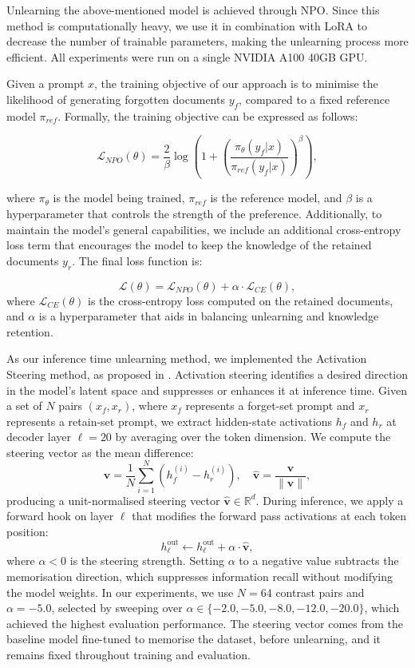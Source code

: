 \documentclass[10pt, a4paper]{article}
\begin{document}
Unlearning the above-mentioned model is achieved through NPO. Since this method is computationally heavy, we use it in combination with LoRA to decrease the number of trainable parameters, making the unlearning process more efficient. All experiments were run on a single NVIDIA A100 40GB GPU.

Given a prompt $x$, the training objective of our approach is to minimise the likelihood of generating forgotten documents $y_f$, compared to a fixed reference model $\pi_{ref}$. Formally, the training objective can be expressed as follows:

\[
\mathcal{L}_{NPO}(\theta) = \frac{2}{\beta} \log \left(1 + \left(\frac{\pi_{\theta}(y_f|x)}{\pi_{ref}(y_f|x)}\right)^\beta\right),
\]

where $\pi_{\theta}$ is the model being trained, $\pi_{ref}$ is the reference model, and $\beta$ is a hyperparameter that controls the strength of the preference. Additionally, to maintain the model's general capabilities, we include an additional cross-entropy loss term that encourages the model to keep the knowledge of the retained documents $y_r$.
The final loss function is:

\[
\mathcal{L}(\theta) = \mathcal{L}_{NPO}(\theta) + \alpha \cdot \mathcal{L}_{CE}(\theta),
\]
where $\mathcal{L}_{CE}(\theta)$ is the cross-entropy loss computed on the retained documents, and $\alpha$ is a hyperparameter that aids in balancing unlearning and knowledge retention.

As our inference time unlearning method, we implemented the
Activation Steering method, as proposed in \citep{stolfo2024activationsteering}. Activation steering identifies a desired direction in the model's latent space and suppresses or enhances it at inference time. 
Given a set of $N$ pairs $(x_f, x_r)$, where $x_f$ represents a forget-set prompt and $x_r$ represents a retain-set prompt, we extract hidden-state
activations $h_f$ and $h_r$ at decoder layer $\ell = 20$ by 
averaging over the token dimension. We compute the steering vector as 
the mean difference:
\[
\mathbf{v} = \frac{1}{N}\sum_{i=1}^{N}\left(h_f^{(i)} - h_r^{(i)}\right), 
\quad \hat{\mathbf{v}} = \frac{\mathbf{v}}{\|\mathbf{v}\|},
\]
producing a unit-normalised steering vector $\hat{\mathbf{v}} \in \mathbb{R}^{d}$.
During inference, 
we apply a forward hook on layer $\ell$ that modifies the forward pass
activations at each token position:
\[
h_{\ell}^{\text{out}} \leftarrow h_{\ell}^{\text{out}} + \alpha \cdot \hat{\mathbf{v}},
\]
where $\alpha < 0$ is the steering strength. Setting $\alpha$ to a negative value subtracts 
the memorisation direction, which suppresses information recall without modifying the 
model weights. In our experiments, we use $N = 64$ contrast pairs and 
$\alpha = -5.0$, selected by sweeping over 
$\alpha \in \{-2.0, -5.0, -8.0, -12.0, -20.0\}$, which achieved the highest evaluation performance. The steering vector comes from the baseline model fine-tuned to memorise the dataset,
before unlearning, and it remains fixed throughout training and evaluation.
\end{document}
